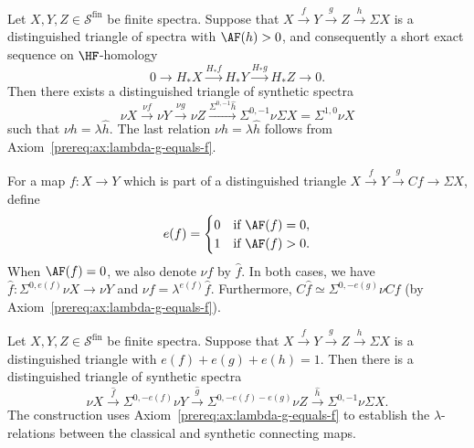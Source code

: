 \begin{axiom}\label{prereq:ax:syn-distinguished-triangle}
    \leanok
    Let $X, Y, Z \in \mathcal{S}^{\mathrm{fin}}$ be finite spectra. Suppose that $X \xrightarrow{f} Y \xrightarrow{g} Z \xrightarrow{h} \Sigma X$ is a distinguished triangle of spectra with $\AF(h) > 0$, and consequently a short exact sequence on $\HF$-homology
    $$0 \to H_*X \xrightarrow{H_*f} H_*Y \xrightarrow{H_*g} H_*Z \to 0.$$
    Then there exists a distinguished triangle of synthetic spectra
    $$\nu X \xrightarrow{\nu f} \nu Y \xrightarrow{\nu g} \nu Z \xrightarrow{\Sigma^{0,-1}\hat{h}} \Sigma^{0,-1}\nu \Sigma X = \Sigma^{1,0}\nu X$$
    such that $\nu h = \lambda \hat{h}$. The last relation $\nu h = \lambda \hat{h}$ follows from Axiom~\ref{prereq:ax:lambda-g-equals-f}.
\end{axiom}

\begin{notation}\label{prereq:not:fhat}
    \leanok
    For a map $f: X \to Y$ which is part of a distinguished triangle $X \xrightarrow{f} Y \xrightarrow{g} Cf \to \Sigma X$, define
    $$e(f) = \begin{cases}
        0 & \text{if } \AF(f) = 0, \\
        1 & \text{if } \AF(f) > 0.
    \end{cases}$$
    When $\AF(f) = 0$, we also denote $\nu f$ by $\hat{f}$. In both cases, we have $\hat{f}: \Sigma^{0,e(f)}\nu X \to \nu Y$ and $\nu f = \lambda^{e(f)}\hat{f}$. Furthermore, $C\hat{f} \simeq \Sigma^{0,-e(g)}\nu Cf$ (by Axiom~\ref{prereq:ax:lambda-g-equals-f}).
\end{notation}

\begin{axiom}\label{prereq:ax:fhat-triangle}
    \leanok
    Let $X, Y, Z \in \mathcal{S}^{\mathrm{fin}}$ be finite spectra. Suppose that $X \xrightarrow{f} Y \xrightarrow{g} Z \xrightarrow{h} \Sigma X$ is a distinguished triangle with $e(f) + e(g) + e(h) = 1$. Then there is a distinguished triangle of synthetic spectra
    $$\nu X \xrightarrow{\hat{f}} \Sigma^{0,-e(f)}\nu Y \xrightarrow{\hat{g}} \Sigma^{0,-e(f)-e(g)}\nu Z \xrightarrow{\hat{h}} \Sigma^{0,-1}\nu \Sigma X.$$
    The construction uses Axiom~\ref{prereq:ax:lambda-g-equals-f} to establish the $\lambda$-relations between the classical and synthetic connecting maps.
\end{axiom}
